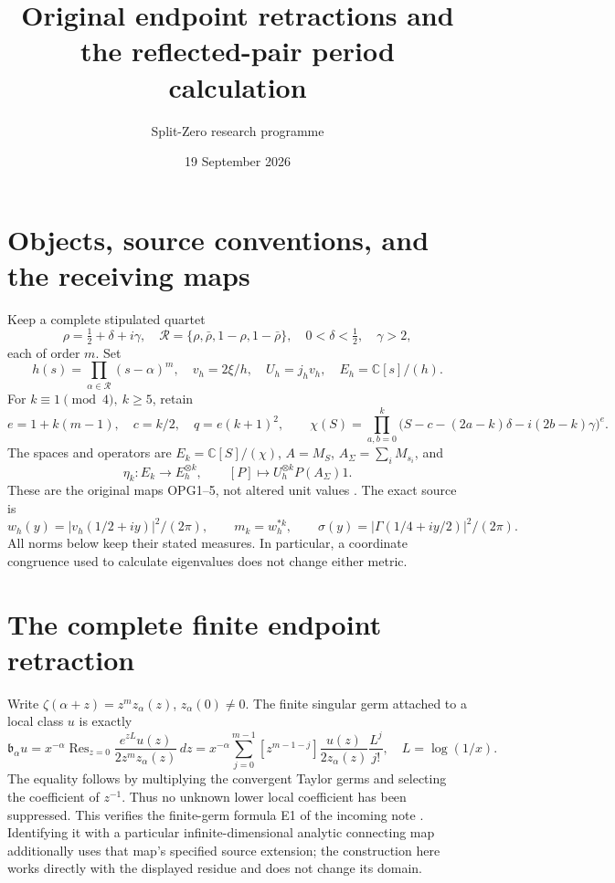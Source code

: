 \documentclass[11pt]{article}
\title{Original endpoint retractions and the reflected-pair period calculation}
\author{Split-Zero research programme}
\date{19 September 2026}
\DeclareMathOperator{\Res}{Res}
\begin{document}
\maketitle

\section{Objects, source conventions, and the receiving maps}
Keep a complete stipulated quartet
\[
 \rho=\tfrac12+\delta+i\gamma,\quad
 \mathcal R=\{\rho,\bar\rho,1-\rho,1-\bar\rho\},\quad
 0<\delta<\tfrac12,\quad\gamma>2,
\]
each of order \(m\). Set
\[
 h(s)=\prod_{\alpha\in\mathcal R}(s-\alpha)^m,\quad
 v_h=2\xi/h,\quad U_h=j_hv_h,\quad
 E_h=\mathbb C[s]/(h).
\]
For \(k\equiv1\pmod4,\ k\ge5\), retain
\[
 e=1+k(m-1),\quad c=k/2,\quad q=e(k+1)^2,\qquad
 \chi(S)=\prod_{a,b=0}^k
 \bigl(S-c-(2a-k)\delta-i(2b-k)\gamma\bigr)^e.
\]
The spaces and operators are \(E_k=\mathbb C[S]/(\chi)\),
\(A=M_S\), \(A_\Sigma=\sum_iM_{s_i}\), and
\[
 \eta_k:E_k\longrightarrow E_h^{\otimes k},\qquad
 [P]\longmapsto U_h^{\otimes k}P(A_\Sigma)1.                 \tag{ET1}
\]
These are the original maps OPG1--5, not altered unit values
\cite[OPG1--5]{Current}. The exact source is
\[
 w_h(y)=|v_h(1/2+iy)|^2/(2\pi),\qquad m_k=w_h^{*k},\qquad
 \sigma(y)=|\Gamma(1/4+iy/2)|^2/(2\pi).
                                                               \tag{ET2}
\]
All norms below keep their stated measures. In particular, a coordinate
congruence used to calculate eigenvalues does not change either metric.

\section{The complete finite endpoint retraction}
Write \(\zeta(\alpha+z)=z^m z_\alpha(z)\), \(z_\alpha(0)\ne0\).
The finite singular germ attached to a local class \(u\) is exactly
\[
 \mathfrak b_\alpha u
 =x^{-\alpha}\Res_{z=0}
       \frac{e^{zL}u(z)}{2z^mz_\alpha(z)}\,dz
 =x^{-\alpha}\sum_{j=0}^{m-1}
 [z^{m-1-j}]\frac{u(z)}{2z_\alpha(z)}\frac{L^j}{j!},
 \quad L=\log(1/x).                                    \tag{ET3}
\]
The equality follows by multiplying the convergent Taylor germs and
selecting the coefficient of \(z^{-1}\). Thus no unknown lower local
coefficient has been suppressed. This verifies the finite-germ formula
E1 of the incoming note \cite[E1]{Incoming}. Identifying it with a
particular infinite-dimensional analytic connecting map additionally
uses that map's specified source extension; the construction here works
directly with the displayed residue and does not change its domain.
\end{document}

